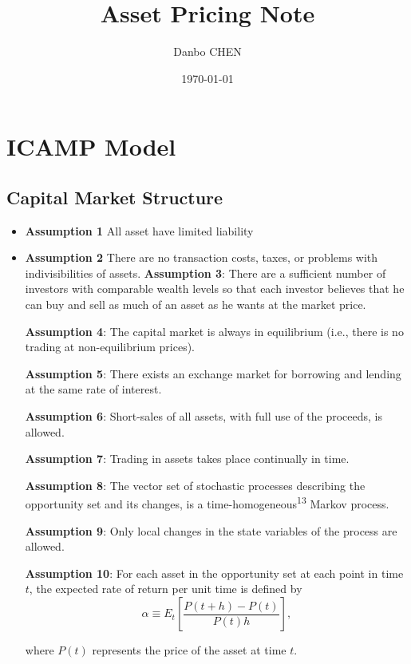 \documentclass{article}
\title{Asset Pricing Note}
\author{Danbo CHEN}
\date{\today}
\begin{document}
\maketitle
\vspace{.25in}
\tableofcontents

\section{ICAMP Model}
\subsection{Capital Market Structure}
\begin{itemize}
    \item \textbf{Assumption 1} All asset have limited liability
    \item \textbf{Assumption 2} There are no transaction costs, taxes, or problems with indivisibilities of assets.
    \textbf{Assumption 3}: There are a sufficient number of investors with comparable wealth levels so that each investor believes that he can buy and sell as much of an asset as he wants at the market price.

    \textbf{Assumption 4}: The capital market is always in equilibrium (i.e., there is no trading at non-equilibrium prices).
    
    \textbf{Assumption 5}: There exists an exchange market for borrowing and lending at the same rate of interest.
    
    \textbf{Assumption 6}: Short-sales of all assets, with full use of the proceeds, is allowed.
    
    \textbf{Assumption 7}: Trading in assets takes place continually in time.
    
    \textbf{Assumption 8}: The vector set of stochastic processes describing the opportunity set and its changes, is a time-homogeneous\textsuperscript{13} Markov process.

    \textbf{Assumption 9}: Only local changes in the state variables of the process are allowed.

    \textbf{Assumption 10}: For each asset in the opportunity set at each point in time \( t \), the expected rate of return per unit time is defined by \[
    \alpha \equiv E_t \left[ \frac{P(t + h) - P(t)}{P(t)h} \right],
    \]

where \( P(t) \) represents the price of the asset at time \( t \).

\end{itemize}
\end{document}
